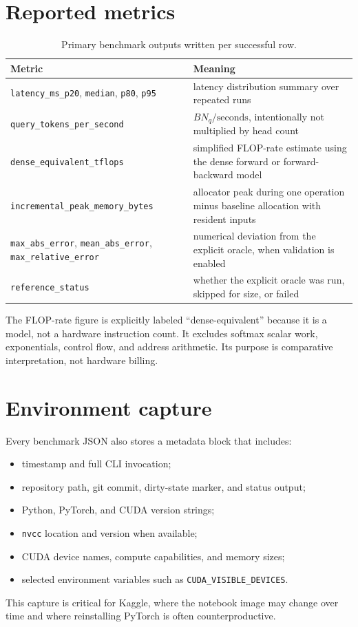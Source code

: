 \section{Reported metrics}

\begin{table}[htbp]
\centering
\caption{Primary benchmark outputs written per successful row.}
\label{tab:benchmark-metrics}
\begin{tabularx}{\textwidth}{@{}p{} X@{}}
\toprule
Metric & Meaning \\
\midrule
\texttt{latency\_ms\_p20}, \texttt{median}, \texttt{p80}, \texttt{p95} & latency distribution summary over repeated runs \\
\texttt{query\_tokens\_per\_second} & $B N_q / \text{seconds}$, intentionally not multiplied by head count \\
\texttt{dense\_equivalent\_tflops} & simplified FLOP-rate estimate using the dense forward or forward-backward model \\
\texttt{incremental\_peak\_memory\_bytes} & allocator peak during one operation minus baseline allocation with resident inputs \\
\texttt{max\_abs\_error}, \texttt{mean\_abs\_error}, \texttt{max\_relative\_error} & numerical deviation from the explicit oracle, when validation is enabled \\
\texttt{reference\_status} & whether the explicit oracle was run, skipped for size, or failed \\
\bottomrule
\end{tabularx}
\end{table}

The FLOP-rate figure is explicitly labeled ``dense-equivalent'' because it is a model, not a hardware instruction count. It excludes softmax scalar work, exponentials, control flow, and address arithmetic. Its purpose is comparative interpretation, not hardware billing.

\section{Environment capture}

Every benchmark JSON also stores a metadata block that includes:
\begin{itemize}
  \item timestamp and full CLI invocation;
  \item repository path, git commit, dirty-state marker, and status output;
  \item Python, PyTorch, and CUDA version strings;
  \item \texttt{nvcc} location and version when available;
  \item CUDA device names, compute capabilities, and memory sizes;
  \item selected environment variables such as \texttt{CUDA\_VISIBLE\_DEVICES}.
\end{itemize}
This capture is critical for Kaggle, where the notebook image may change over time and where reinstalling PyTorch is often counterproductive.

